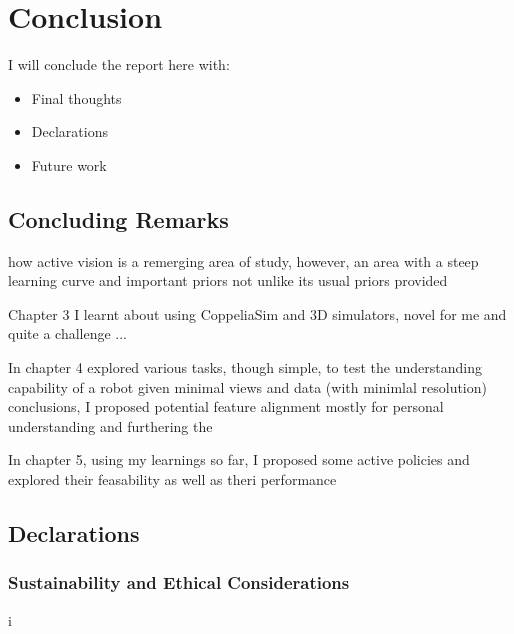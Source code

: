 \chapter{Conclusion}
I will conclude the report here with:
\begin{itemize}
  \item Final thoughts
  \item Declarations
  \item Future work
\end{itemize}

\section{Concluding Remarks}
how active vision is a remerging area of study, however, an area with a steep learning curve and important priors not unlike its usual priors provided 


Chapter 3 I learnt about using CoppeliaSim and 3D simulators, novel for me and quite a challenge ...


In chapter 4 explored various tasks, though simple, to test the understanding capability of a robot given minimal views and data (with minimlal resolution) conclusions, I proposed potential feature alignment mostly for personal understanding and furthering the 

In chapter 5, using my learnings so far, I proposed some active policies and explored their feasability as well as theri performance




\section{Declarations}
  \subsection{Sustainability and Ethical Considerations}i

